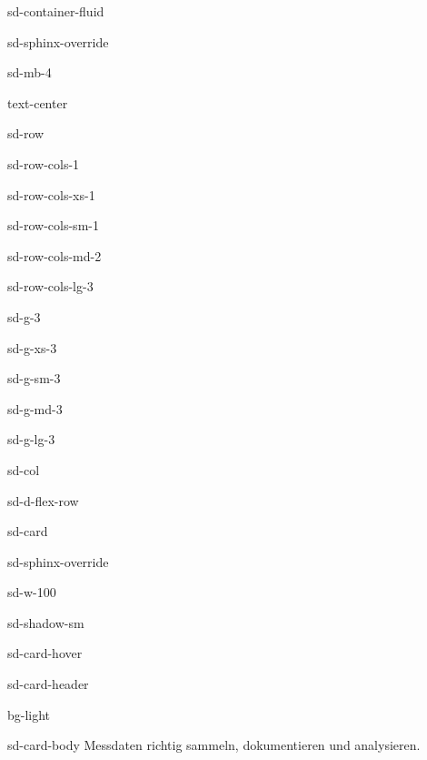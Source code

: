 \documentclass[letterpaper,10pt,english]{jupyterBook}
\begin{document}
\begin{sphinxuseclass}{sd-container-fluid}
\begin{sphinxuseclass}{sd-sphinx-override}
\begin{sphinxuseclass}{sd-mb-4}
\begin{sphinxuseclass}{text-center}
\begin{sphinxuseclass}{sd-row}
\begin{sphinxuseclass}{sd-row-cols-1}
\begin{sphinxuseclass}{sd-row-cols-xs-1}
\begin{sphinxuseclass}{sd-row-cols-sm-1}
\begin{sphinxuseclass}{sd-row-cols-md-2}
\begin{sphinxuseclass}{sd-row-cols-lg-3}
\begin{sphinxuseclass}{sd-g-3}
\begin{sphinxuseclass}{sd-g-xs-3}
\begin{sphinxuseclass}{sd-g-sm-3}
\begin{sphinxuseclass}{sd-g-md-3}
\begin{sphinxuseclass}{sd-g-lg-3}
\begin{sphinxuseclass}{sd-col}
\begin{sphinxuseclass}{sd-d-flex-row}
\begin{sphinxuseclass}{sd-card}
\begin{sphinxuseclass}{sd-sphinx-override}
\begin{sphinxuseclass}{sd-w-100}
\begin{sphinxuseclass}{sd-shadow-sm}
\begin{sphinxuseclass}{sd-card-hover}
\begin{sphinxuseclass}{sd-card-header}
\begin{sphinxuseclass}{bg-light}
\sphinxAtStartPar
{} 👩‍🔬

\end{sphinxuseclass}
\end{sphinxuseclass}
\begin{sphinxuseclass}{sd-card-body}
\sphinxAtStartPar
Messdaten richtig sammeln, dokumentieren und analysieren.


\end{sphinxuseclass}
\end{sphinxuseclass}
\end{sphinxuseclass}
\end{sphinxuseclass}
\end{sphinxuseclass}
\end{sphinxuseclass}
\end{sphinxuseclass}
\end{sphinxuseclass}
\end{sphinxuseclass}
\end{sphinxuseclass}
\end{sphinxuseclass}
\end{sphinxuseclass}
\end{sphinxuseclass}
\end{sphinxuseclass}
\end{sphinxuseclass}
\end{sphinxuseclass}
\end{sphinxuseclass}
\end{sphinxuseclass}
\end{sphinxuseclass}
\end{sphinxuseclass}
\end{sphinxuseclass}
\end{sphinxuseclass}
\end{sphinxuseclass}
\end{document}
